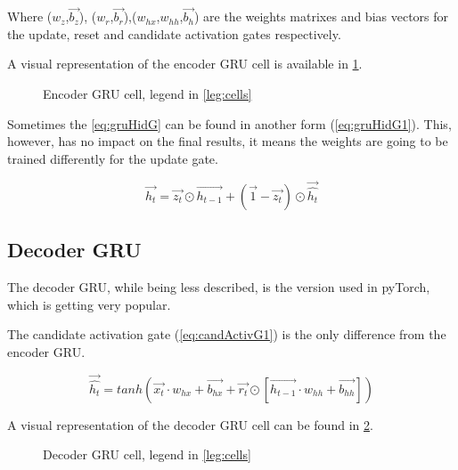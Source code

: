 Where ($w_z$,$\overrightarrow{b_z}$), ($w_r$,$\overrightarrow{b_r}$),($w_{hx}$,$w_{hh}$,$\overrightarrow{b_h}$) are the weights matrixes and bias vectors for the update, reset and candidate activation gates respectively.

A visual representation of the encoder \ac{GRU} cell is available in \cref{fig:encoderGruCell}.

\begin{figure}[H]
  \centering
  
  \label{fig:encoderGruCell}
  \caption{Encoder \acs{GRU} cell, legend in \cref{leg:cells}}
\end{figure}

Sometimes the \cref{eq:gruHidG} can be found in another form (\cref{eq:gruHidG1})\cite{gruPyTorch}. This, however, has no impact on the final results, it means the weights are going to be trained differently for the update gate.

\begin{equation}\label{eq:gruHidG1}
  \overrightarrow{h_t}=\overrightarrow{z_t}\odot \overrightarrow{h_{t-1}} + (\overrightarrow{1}-\overrightarrow{z_t})\odot \overrightarrow{\hat{h_t}}
\end{equation}

\subsection{Decoder \ac{GRU}}

The decoder \ac{GRU}, while being less described, is the version used in pyTorch, which is getting very popular.

The candidate activation gate (\cref{eq:candActivG1}) is the only difference from the encoder \ac{GRU}.

\begin{equation}\label{eq:candActivG1}
  \overrightarrow{\hat{h_t}}=tanh(\overrightarrow{x_t}\cdot w_{hx}+ \overrightarrow{b_{hx}}+\overrightarrow{r_t}\odot[\overrightarrow{h_{t-1}} \cdot w_{hh} + \overrightarrow{b_{hh}}])
\end{equation}

A visual representation of the decoder \ac{GRU} cell can be found in \cref{fig:decoderGruCell}.

\begin{figure}[H]
  \centering
  
  \label{fig:decoderGruCell}
  \caption{Decoder \acs{GRU} cell, legend in \cref{leg:cells}}
\end{figure}

